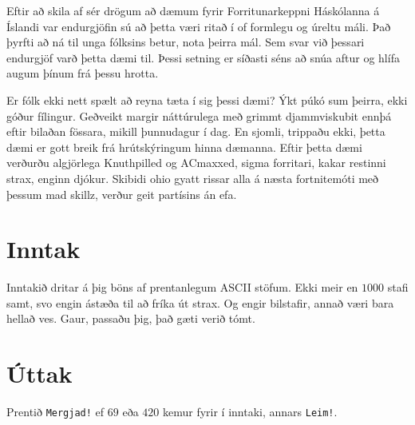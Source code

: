 
Eftir að skila af sér drögum að dæmum fyrir Forritunarkeppni
Háskólanna á Íslandi var endurgjöfin sú að þetta væri ritað í
of formlegu og úreltu máli. Það þyrfti að ná til unga fólksins
betur, nota þeirra mál. Sem svar við þessari endurgjöf varð
þetta dæmi til. Þessi setning er síðasti séns að snúa aftur
og hlífa augum þínum frá þessu hrotta.

Er fólk ekki nett spælt að reyna tæta í sig þessi dæmi?
Ýkt púkó sum þeirra, ekki góður fílingur.
Geðveikt margir náttúrulega með grimmt djammviskubit ennþá eftir
bilaðan fössara, mikill þunnudagur í dag.
En sjomli, trippaðu ekki, þetta dæmi er gott breik frá
hrútskýringum hinna dæmanna.
Eftir þetta dæmi verðurðu algjörlega Knuthpilled og
ACmaxxed, sigma forritari, kakar restinni strax,
enginn djókur.
Skibidi ohio gyatt rissar alla á næsta fortnitemóti 
með þessum mad skillz, verður geit partísins án efa.

\section*{Inntak}

Inntakið dritar á þig böns af prentanlegum ASCII stöfum.
Ekki meir en $1000$ stafi 
samt, svo engin ástæða til að fríka út strax. Og engir
bilstafir, annað væri bara hellað ves.
Gaur, passaðu þig, það gæti verið tómt.

\section*{Úttak}

Prentið \texttt{Mergjad!} ef $69$ eða $420$ kemur fyrir
í inntaki, annars \texttt{Leim!}.
